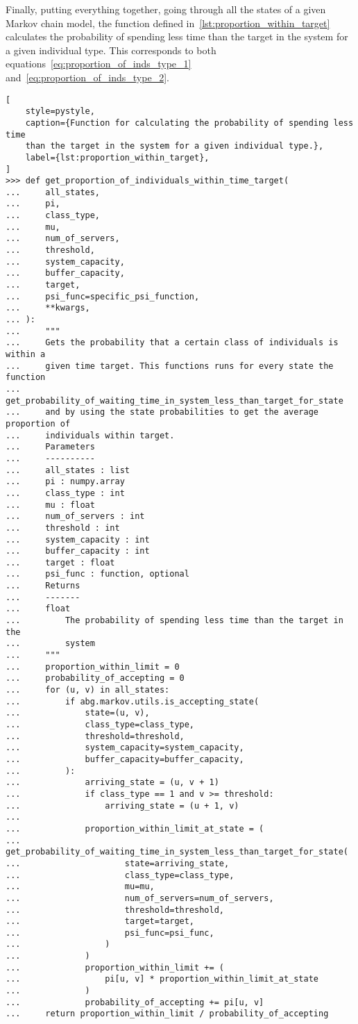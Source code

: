 Finally, putting everything together, going through all the states of a given
Markov chain model, the function defined in~\ref{lst:proportion_within_target}
calculates the probability of
spending less time than the target in the system for a given individual type.
This corresponds to both equations~\eqref{eq:proportion_of_inds_type_1}
and~\eqref{eq:proportion_of_inds_type_2}.

\begin{lstlisting}[
    style=pystyle,
    caption={Function for calculating the probability of spending less time
    than the target in the system for a given individual type.},
    label={lst:proportion_within_target},
]
>>> def get_proportion_of_individuals_within_time_target(
...     all_states,
...     pi,
...     class_type,
...     mu,
...     num_of_servers,
...     threshold,
...     system_capacity,
...     buffer_capacity,
...     target,
...     psi_func=specific_psi_function,
...     **kwargs,
... ):
...     """
...     Gets the probability that a certain class of individuals is within a
...     given time target. This functions runs for every state the function
...     get_probability_of_waiting_time_in_system_less_than_target_for_state
...     and by using the state probabilities to get the average proportion of
...     individuals within target.
...     Parameters
...     ----------
...     all_states : list
...     pi : numpy.array
...     class_type : int
...     mu : float
...     num_of_servers : int
...     threshold : int
...     system_capacity : int
...     buffer_capacity : int
...     target : float
...     psi_func : function, optional
...     Returns
...     -------
...     float
...         The probability of spending less time than the target in the
...         system
...     """
...     proportion_within_limit = 0
...     probability_of_accepting = 0
...     for (u, v) in all_states:
...         if abg.markov.utils.is_accepting_state(
...             state=(u, v),
...             class_type=class_type,
...             threshold=threshold,
...             system_capacity=system_capacity,
...             buffer_capacity=buffer_capacity,
...         ):
...             arriving_state = (u, v + 1)
...             if class_type == 1 and v >= threshold:
...                 arriving_state = (u + 1, v)
... 
...             proportion_within_limit_at_state = (
...                 get_probability_of_waiting_time_in_system_less_than_target_for_state(
...                     state=arriving_state,
...                     class_type=class_type,
...                     mu=mu,
...                     num_of_servers=num_of_servers,
...                     threshold=threshold,
...                     target=target,
...                     psi_func=psi_func,
...                 )
...             )
...             proportion_within_limit += (
...                 pi[u, v] * proportion_within_limit_at_state
...             )
...             probability_of_accepting += pi[u, v]
...     return proportion_within_limit / probability_of_accepting

\end{lstlisting}

